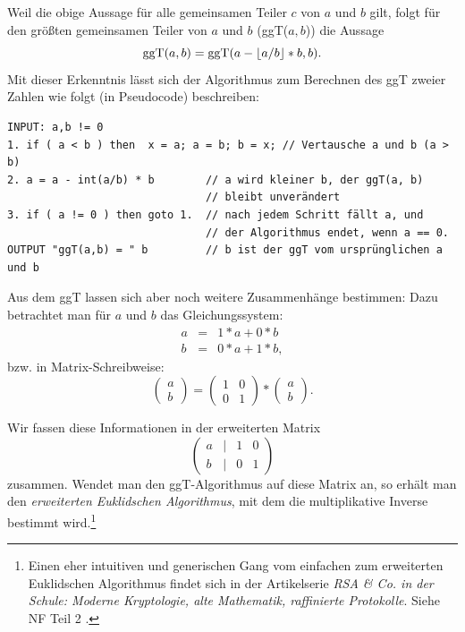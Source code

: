 \begin{refsegment}
Weil die obige Aussage für alle gemeinsamen Teiler $c$ von $a$ und $b$ gilt,
folgt für den größten gemeinsamen Teiler von $a$ und $b$ (ggT($a,b$)) die
Aussage $$ {\rm ggT}(a,b) = {\rm ggT}(a - \lfloor a/b \rfloor * b, b). $$
Mit dieser Erkenntnis lässt sich der Algorithmus zum Berechnen des ggT zweier
Zahlen wie folgt (in Pseudocode) beschreiben:

\begin{verbatim}
INPUT: a,b != 0
1. if ( a < b ) then  x = a; a = b; b = x; // Vertausche a und b (a > b)
2. a = a - int(a/b) * b        // a wird kleiner b, der ggT(a, b)
                               // bleibt unverändert
3. if ( a != 0 ) then goto 1.  // nach jedem Schritt fällt a, und
                               // der Algorithmus endet, wenn a == 0.
OUTPUT "ggT(a,b) = " b         // b ist der ggT vom ursprünglichen a und b
\end{verbatim}


Aus dem ggT lassen sich aber noch weitere Zusammenhänge bestimmen:
Dazu betrachtet man für $a$ und $b$ das Gleichungssystem:
\begin{eqnarray*}
 a & = & 1*a + 0*b \nonumber\\
 b & = & 0*a + 1*b, \nonumber
\end{eqnarray*}
bzw. in Matrix-Schreibweise:
$$ \left(\begin{array}{c}a \\ b\end{array}\right) =
   \left(\begin{array}{cc} 1 & 0 \\ 0 & 1 \end{array}\right) *
   \left(\begin{array}{c} a \\ b \end{array} \right).$$

\noindent Wir fassen diese Informationen in der erweiterten Matrix
$$\left(\begin{array}{cccc} a & | & 1 & 0 \\ b & | & 0 & 1 \end{array} \right)$$
zusammen. Wendet man den ggT-Algorithmus auf diese Matrix an, so erhält man den
{\em erweiterten Euklidschen Algorithmus}, mit dem die multiplikative Inverse
bestimmt wird.\footnote{%
  Einen eher intuitiven und generischen Gang vom einfachen zum erweiterten
  Euklidschen Algorithmus findet sich in der Artikelserie {\em RSA \& Co.
  in der Schule: Moderne Kryptologie, alte Mathematik, raffinierte Protokolle}.
  Siehe NF Teil 2 \cite{Witten2006}.
}


\end{refsegment}
